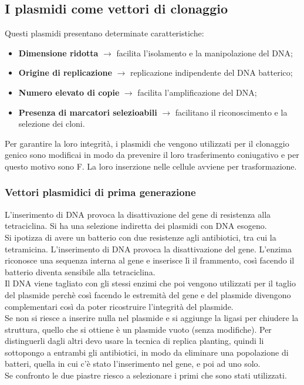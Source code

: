 \subsection{I plasmidi come vettori di clonaggio}
Questi plasmidi presentano determinate caratteristiche:
\begin{itemize}
    \item \textbf{Dimensione ridotta} $\xrightarrow{}$ facilita l'isolamento e la manipolazione del DNA; 
    \item \textbf{Origine di replicazione} $\xrightarrow{}$ replicazione indipendente del DNA batterico; 
    \item \textbf{Numero elevato di copie} $\xrightarrow{}$ facilita l'amplificazione del DNA;
    \item \textbf{Presenza di marcatori selezioabili} $\xrightarrow{}$ facilitano il riconoscimento e la selezione dei cloni. 
\end{itemize}
Per garantire la loro integrità, i plasmidi che vengono utilizzati per il clonaggio genico sono modificai in modo da prevenire il loro trasferimento coniugativo e per questo motivo sono F\ap{-}. La loro inserzione nelle cellule avviene per trasformazione. 
\subsubsection{Vettori plasmidici di prima generazione}
L'inserimento di DNA provoca la disattivazione del gene di resistenza alla tetraciclina. Si ha una selezione indiretta dei plasmidi con DNA esogeno.
\\Si ipotizza di avere un batterio con due resistenze agli antibiotici, tra cui la tetramicina. L'inserimento di DNA provoca la disattivazione del gene. L'enzima riconosce una sequenza interna al gene e inserisce lì il frammento, così facendo il batterio diventa sensibile alla tetraciclina. 
\\Il DNA viene tagliato con gli stessi enzimi che poi vengono utilizzati per il taglio del plasmide perchè così facendo le estremità del gene e del plasmide divengono complementari così da poter ricostruire l'integrità del plasmide. 
\\Se non si riesce a inserire nulla nel plasmide e si aggiunge la ligasi per chiudere la struttura, quello che si ottiene è un plasmide vuoto (senza modifiche). Per distinguerli dagli altri devo usare la tecnica di replica planting, quindi li sottopongo a entrambi gli antibiotici, in modo da eliminare una popolazione di batteri, quella in cui c'è stato l'inserimento nel gene, e poi ad uno solo.
\\Se confronto le due piastre riesco a selezionare i primi che sono stati utilizzati. 
